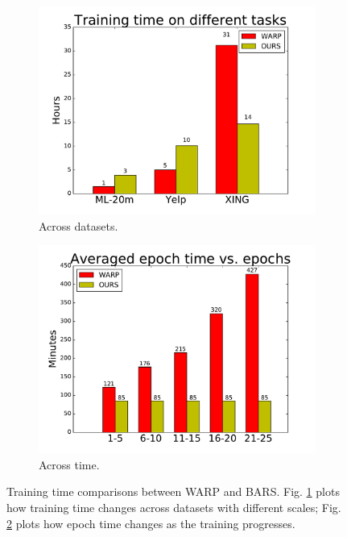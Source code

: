\documentclass[letterpaper]{article} %
\begin{document}
\begin{figure}
\centering
\begin{subfigure}{.25\textwidth}
  \centering
  \includegraphics[width=.99\linewidth]{pics/tconv-eps-converted-to}
  \caption{Across datasets.}
  \label{fig:tconv}
\end{subfigure}%
\begin{subfigure}{.25\textwidth}
  \centering
  \includegraphics[width=.99\linewidth]{pics/tepoch-eps-converted-to}
  \caption{Across time.}
  \label{fig:tepoch}
\end{subfigure}
\caption{Training time comparisons between WARP and BARS. Fig. \ref{fig:tconv} plots how training time changes across datasets with different scales; Fig. \ref{fig:tepoch} plots how epoch time changes as the training progresses. }
\label{fig:time}
\end{figure}
\end{document}
